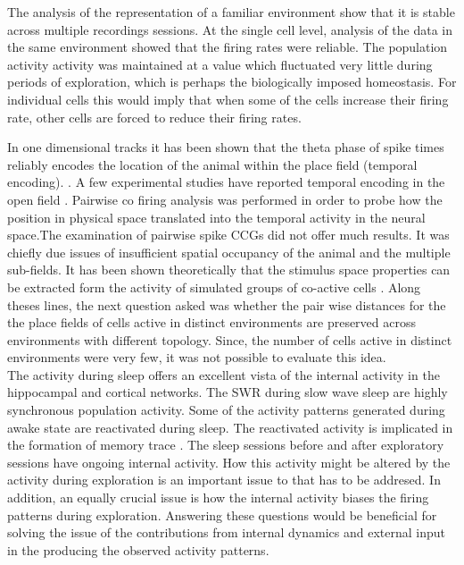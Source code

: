 The analysis of the representation of a familiar environment show that it is stable across multiple recordings sessions. At the single cell level, analysis of the data in the same environment showed that the firing rates were reliable. The population activity activity was maintained at a value which fluctuated very little during periods of exploration, which is perhaps the biologically imposed homeostasis. For individual cells this would imply that when some of the cells increase their firing rate, other cells are forced to reduce their firing rates. 

In one dimensional tracks it has been shown that the theta phase of spike times reliably encodes the location of the animal within the place field (temporal encoding). \cite{O'Keefe1993, Skaggs1996c, Huxter2003}. A few experimental studies have reported temporal encoding in the open field \cite{Huxter2008a}. Pairwise co firing analysis was performed in order to probe how the position in physical space translated into the temporal activity in the neural space.The examination of pairwise spike CCGs did not offer much results. It was chiefly due issues of insufficient spatial occupancy of the animal and the multiple sub-fields. It has been shown theoretically that the stimulus space properties can be extracted form the activity of simulated groups of co-active cells \cite{Curto2008}. Along theses lines, the next question asked was whether the pair wise distances for the the place fields of cells active in distinct environments are preserved across environments with different topology. Since, the number of cells active in distinct environments were very few, it was not possible to evaluate this idea. \\

The activity during sleep offers an excellent vista of the internal activity in the hippocampal and cortical networks. The SWR during slow wave sleep are highly synchronous population activity. Some of the activity patterns generated during awake state are reactivated during sleep. The reactivated activity is implicated in the formation of memory trace \cite{Buzsaki1989}. The sleep sessions before and after exploratory sessions have ongoing internal activity. How this activity might be altered by the activity during exploration is an important issue to that has to be addresed. In addition, an equally crucial issue is how the internal activity biases the firing patterns during exploration. Answering these questions would be beneficial for solving the issue of the contributions from internal dynamics and external input in the producing the observed activity patterns.  \\

